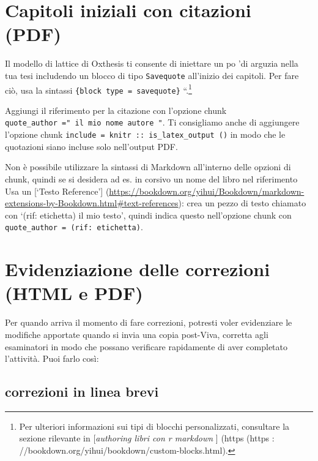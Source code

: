 \documentclass[a4paper, 11pt, nobind]{templates/ociamthesis}
\begin{document}
\hypertarget{capitoli-iniziali-con-citazioni-pdf}{%
\section{Capitoli iniziali con citazioni (PDF)}\label{capitoli-iniziali-con-citazioni-pdf}}

Il modello di lattice di Oxthesis ti consente di iniettare un po 'di arguzia nella tua tesi includendo un blocco di tipo \texttt{Savequote} all'inizio dei capitoli.
Per fare ciò, usa la sintassi \texttt{} \texttt{\{block\ type\ =\ \textquotesingle{}savequote\textquotesingle{}\}} ``.\footnote{Per ulteriori informazioni sui tipi di blocchi personalizzati, consultare la sezione rilevante in {[}\emph{authoring libri con r markdown }{]} (https (https : //bookdown.org/yihui/bookdown/custom-blocks.html).}

Aggiungi il riferimento per la citazione con l'opzione chunk \texttt{quote\_author\ ="\ il\ mio\ nome\ autore\ "}.
Ti consigliamo anche di aggiungere l'opzione chunk \texttt{include\ =\ knitr\ ::\ is\_latex\_output\ ()} in modo che le quotazioni siano incluse solo nell'output PDF.

Non è possibile utilizzare la sintassi di Markdown all'interno delle opzioni di chunk, quindi se si desidera ad es. in corsivo un nome del libro nel riferimento Usa un {[}`Testo Reference'{]} (\url{https://bookdown.org/yihui/Bookdown/markdown-extensions-by-Bookdown.html\#text-references}): crea un pezzo di testo chiamato con `(rif: etichetta) il mio testo', quindi indica questo nell'opzione chunk con \texttt{quote\_author\ =\ \textquotesingle{}(rif:\ etichetta)\textquotesingle{}}.

\hypertarget{evidenziazione-delle-correzioni-html-e-pdf}{%
\section{Evidenziazione delle correzioni (HTML e PDF)}\label{evidenziazione-delle-correzioni-html-e-pdf}}

Per quando arriva il momento di fare correzioni, potresti voler evidenziare le modifiche apportate quando si invia una copia post-Viva, corretta agli esaminatori in modo che possano verificare rapidamente di aver completato l'attività.
Puoi farlo così:

\hypertarget{correzioni-in-linea-brevi}{%
\subsection{correzioni in linea brevi}\label{correzioni-in-linea-brevi}}
\end{document}
